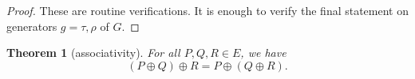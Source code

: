 \documentclass[12pt]{article}
\newtheorem{theorem}{Theorem}[subsection]
\newcommand{\Eoo}{E^{\circ}}
\newcommand{\hplus}{\oplus}
\newcommand{\Go}{\langle\rho\rangle}
\begin{document}
\begin{proof} These are routine verifications.  It is enough to 
verify the final statement on generators $g=\tau,\rho$ of $G$.
\end{proof}


\begin{theorem}[associativity]\label{lemma:pseudo} 
  For all $P,Q,R\in E$, we have
\[
(P\hplus Q)\hplus R = P \hplus (Q\hplus R).
\]
\end{theorem}
\end{document}
